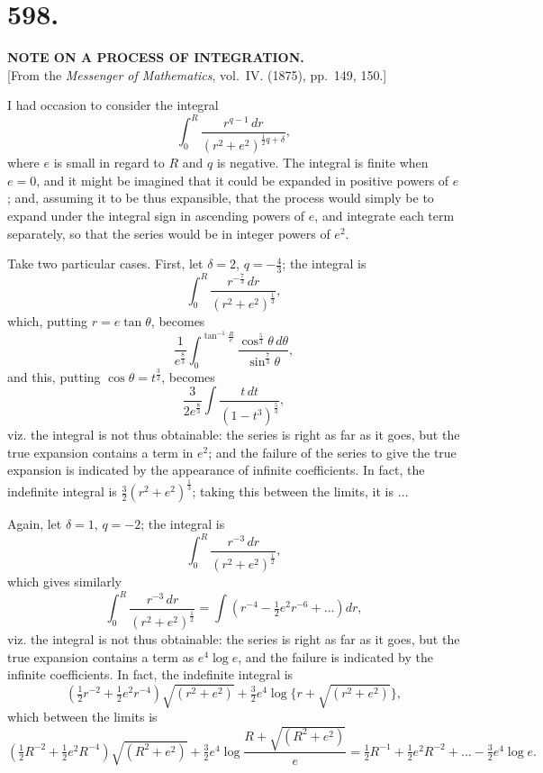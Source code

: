 \documentclass[11pt,a4paper]{article}
\begin{document}
\newpage
\section*{598.}
\begin{center}
{\large\bfseries NOTE ON A PROCESS OF INTEGRATION.}\\[0.5em]
[From the \textit{Messenger of Mathematics}, vol.~IV. (1875), pp.~149, 150.]
\end{center}

I had occasion to consider the integral
\[
\int_0^R \frac{r^{q-1}\,dr}{(r^2+e^2)^{\frac{1}{2}q+\delta}},
\]
where $e$ is small in regard to $R$ and $q$ is negative. The integral is
finite when $e=0$, and it might be imagined that it could be expanded in
positive powers of $e$; and, assuming it to be thus expansible, that the
process would simply be to expand under the integral sign in ascending
powers of $e$, and integrate each term separately, so that the series would
be in integer powers of $e^2$.

Take two particular cases. First, let $\delta=2$, $q=-\tfrac{4}{3}$; the
integral is
\[
\int_0^R \frac{r^{-\frac{7}{3}}\,dr}{(r^2+e^2)^{\frac{1}{3}}},
\]
which, putting $r=e\tan\theta$, becomes
\[
\frac{1}{e^{\frac{8}{3}}} \int_0^{\tan^{-1}\frac{R}{e}}
  \frac{\cos^{\frac{5}{3}}\theta\,d\theta}{\sin^{\frac{7}{3}}\theta},
\]
and this, putting $\cos\theta=t^{\frac{3}{2}}$, becomes
\[
\frac{3}{2e^{\frac{8}{3}}} \int \frac{t\,dt}{(1-t^3)^{\frac{5}{3}}},
\]
viz. the integral is not thus obtainable: the series is right as far as it
goes, but the true expansion contains a term in $e^2$; and the failure of
the series to give the true expansion is indicated by the appearance of
infinite coefficients. In fact, the indefinite integral is
$\tfrac{3}{2}(r^2+e^2)^{\frac{1}{3}}$; taking this between the limits, it is
$\ldots$

Again, let $\delta=1$, $q=-2$; the integral is
\[
\int_0^R \frac{r^{-3}\,dr}{(r^2+e^2)^{\frac{1}{2}}},
\]
which gives similarly
\[
\int_0^R \frac{r^{-3}\,dr}{(r^2+e^2)^{\frac{1}{2}}}
  = \int \left(r^{-4} - \tfrac{1}{2}e^2r^{-6} + \ldots\right)dr,
\]
viz. the integral is not thus obtainable: the series is right as far as it
goes, but the true expansion contains a term as $e^4\log e$, and the failure
is indicated by the infinite coefficients. In fact, the indefinite integral
is
\[
\left(\tfrac{1}{2}r^{-2} + \tfrac{1}{2}e^2r^{-4}\right)\sqrt{(r^2+e^2)}
  + \tfrac{3}{2}e^4\log\{r+\sqrt{(r^2+e^2)}\},
\]
which between the limits is
\[
\left(\tfrac{1}{2}R^{-2} + \tfrac{1}{2}e^2R^{-4}\right)\sqrt{(R^2+e^2)}
  + \tfrac{3}{2}e^4\log\frac{R+\sqrt{(R^2+e^2)}}{e}
  = \tfrac{1}{2}R^{-1} + \tfrac{1}{2}e^2R^{-2} + \ldots
  - \tfrac{3}{2}e^4\log e.
\]
\end{document}
